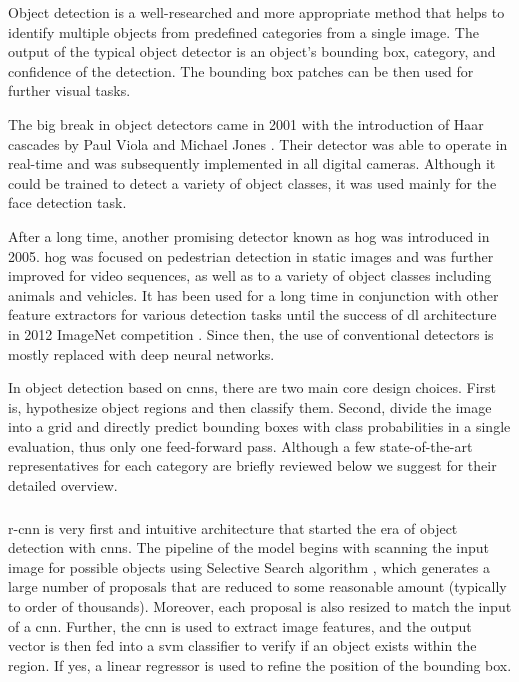         Object detection is a well-researched and more appropriate method that helps to identify multiple objects from predefined categories from a single image. The output of the typical object detector is an object's bounding box, category, and confidence of the detection. The bounding box patches can be then used for further visual tasks.
        
        The big break in object detectors came in 2001 with the introduction of Haar cascades by Paul Viola and Michael Jones \cite{viola2001rapid}. Their detector was able to operate in real-time and was subsequently implemented in all digital cameras. Although it could be trained to detect a variety of object classes, it was used mainly for the face detection task. 
        
        After a long time, another promising detector known as \gls{hog} \cite{dalal2005histograms} was introduced in 2005. \gls{hog} was focused on pedestrian detection in static images and was further improved for video sequences, as well as to a variety of object classes including animals and vehicles. It has been used for a long time in conjunction with other feature extractors for various detection tasks until the success of \gls{dl} architecture in 2012 ImageNet competition \cite{russakovsky2015imagenet}. Since then, the use of conventional detectors is mostly replaced with deep neural networks.
        
        In object detection based on \gls{cnn}s, there are two main core design choices. First is, hypothesize object regions and then classify them. Second, divide the image into a grid and directly predict bounding boxes with class probabilities in a single evaluation, thus only one feed-forward pass. Although a few state-of-the-art representatives for each category are briefly reviewed below we suggest \cite{huang2017speed, xuobjectdetection, ouaknineobjectdetection} for their detailed overview.
        
        \subsubsection{}
            \Gls{r-cnn} \cite{girshick2016region} is very first and intuitive architecture that started the era of object detection with \gls{cnn}s. The pipeline of the model begins with scanning the input image for possible objects using Selective Search algorithm \cite{uijlings2013selective}, which generates a large number of proposals that are reduced to some reasonable amount (typically to order of thousands). Moreover, each proposal is also resized to match the input of a \gls{cnn}. Further, the \gls{cnn} is used to extract image features, and the output vector is then fed into a \gls{svm} classifier to verify if an object exists within the region. If yes, a linear regressor is used to refine the position of the bounding box.
            
